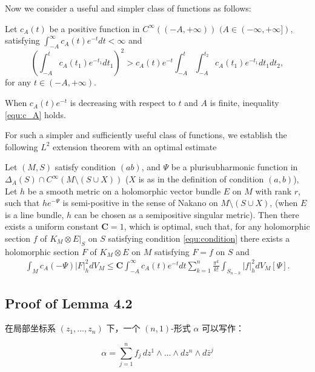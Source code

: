 Now we consider a useful and simpler class of functions as follows:

Let $c_{A}(t)$ be a positive function in $C^{\infty}((-A,+\infty))$
$(A\in(-\infty,+\infty])$, satisfying
$\int_{-A}^{\infty}c_{A}(t)e^{-t}dt<\infty$ and
\begin{equation}
\label{equ:c_A}
\left(\int_{-A}^{t}c_{A}(t_{1})e^{-t_{1}}dt_{1}\right)^{2}>c_{A}(t)e^{-t}
\int_{-A}^{t}\int_{-A}^{t_{2}}c_{A}(t_{1})e^{-t_{1}}dt_{1}dt_{2},
\end{equation}
for any $t\in(-A,+\infty)$.

When $c_{A}(t)e^{-t}$ is decreasing with respect to $t$ and $A$ is finite, inequality \ref{equ:c_A} holds.

For such a simpler and sufficiently useful class of functions, we
establish the following $L^2$ extension theorem with an optimal
estimate
\begin{thm}\label{t:guan-zhou-unify}
  Let $(M,S)$ satisfy condition $(ab)$, and $\Psi$ be a
plurisubharmonic function in $\Delta_{A}(S)\cap
C^{\infty}(M\setminus (S\cup X))$ ($X$ is as in the definition of
condition $(a,b)$), Let $h$ be a smooth metric on a holomorphic
vector bundle $E$ on $M$ with rank $r$, such that $he^{-\Psi}$ is
semi-positive in the sense of Nakano on $M\setminus (S\cup X)$,
(when $E$ is a line bundle, $h$ can be chosen as a semipositive
singular metric). Then there exists a uniform constant
$\mathbf{C}=1$, which is optimal, such that, for any holomorphic
section $f$ of $K_{M}\otimes E|_{S}$ on $S$ satisfying condition
\ref{equ:condition}  there exists a holomorphic section $F$ of
$K_{M}\otimes E$ on $M$ satisfying $F = f$ on $ S$ and
\begin{eqnarray*}
\int_{M}c_{A}(-\Psi)|F|^{2}_{h}dV_{M}
\leq\mathbf{C}\int_{-A}^{\infty}c_{A}(t)e^{-t}dt\sum_{k=1}^{n}\frac{\pi^{k}}{k!}\int_{S_{n-k}}|f|^{2}_{h}dV_{M}[\Psi].
\end{eqnarray*}
\end{thm}
  

\subsection{Proof of Lemma 4.2}

在局部坐标系 \((z_1, \ldots, z_n)\) 下，一个 \((n, 1)\)-形式 \(\alpha\) 可以写作：

\[
\alpha = \sum_{j=1}^{n} f_j \, dz^1 \wedge \ldots \wedge dz^n \wedge d\bar{z}^j
\]

